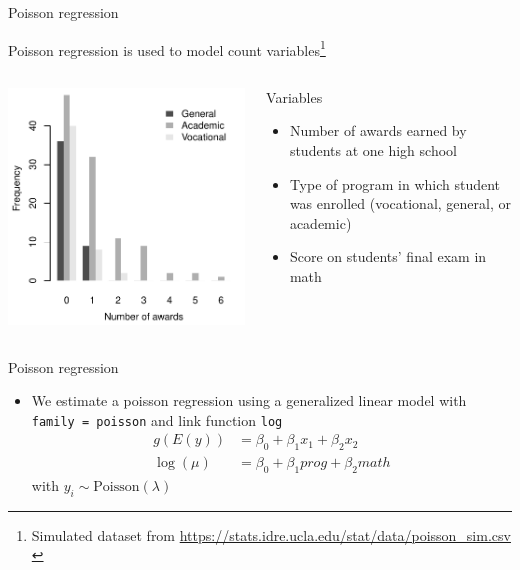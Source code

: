 \documentclass[aspectratio=169]{beamer}
\begin{document}
\begin{frame}{Poisson regression}

Poisson regression is used to model count variables\footnote{Simulated dataset from
  \url{https://stats.idre.ucla.edu/stat/data/poisson_sim.csv} \citep{UCLAstats}}\\[2ex]
\begin{columns}[c]
\begin{column}{.5\textwidth}
  \includegraphics[scale = .65]{../figures/pois_example}
\end{column}
\begin{column}{.5\textwidth}
  Variables
  \begin{itemize}
    \item Number of awards earned by students at one high school
    \item Type of program in which student was enrolled (vocational,
    general, or academic)
    \item Score on students' final exam in math
  \end{itemize}
\end{column}
\end{columns}
\end{frame}

\begin{frame}{Poisson regression}
  \begin{itemize}
    \item We estimate a poisson regression using a generalized linear model
      with \texttt{family = poisson} and link function \texttt{log}
  \begin{align*}
    g(E(y)) & = \beta_0 + \beta_1 x_1 + \beta_2 x_2\\
    \log(\mu) & = \beta_0 + \beta_1 prog + \beta_2 math
  \end{align*}
  with $y_i \sim \text{Poisson}(\lambda)$
  \end{itemize}
\end{frame}
\end{document}
